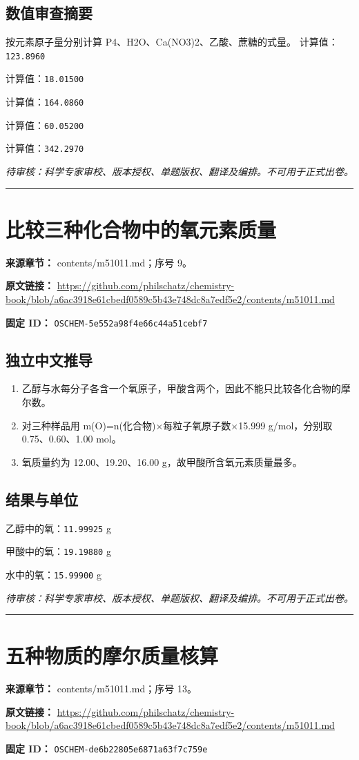 \documentclass[UTF8,11pt,oneside,openany,fontset=none]{ctexbook}
\begin{document}
\subsection*{数值审查摘要}
按元素原子量分别计算 P4、H2O、Ca(NO3)2、乙酸、蔗糖的式量。
\noindent 计算值：\texttt{123.8960}\par
\noindent 计算值：\texttt{18.01500}\par
\noindent 计算值：\texttt{164.0860}\par
\noindent 计算值：\texttt{60.05200}\par
\noindent 计算值：\texttt{342.2970}\par
\noindent\textit{待审核：科学专家审校、版本授权、单题版权、翻译及编排。不可用于正式出卷。}
\medskip\hrule\medskip
\section{比较三种化合物中的氧元素质量}
\noindent\textbf{来源章节：} contents/m51011.md；序号 9。\par
\noindent\textbf{原文链接：} \url{https://github.com/philschatz/chemistry-book/blob/a6ac3918e61cbedf0589c5b43e748dc8a7edf5e2/contents/m51011.md}\par
\noindent\textbf{固定 ID：} \texttt{OSCHEM-5e552a98f4e66c44a51cebf7}\par
\subsection*{独立中文推导}
\begin{enumerate}
\item 乙醇与水每分子各含一个氧原子，甲酸含两个，因此不能只比较各化合物的摩尔数。
\item 对三种样品用 m(O)=n(化合物)×每粒子氧原子数×15.999 g/mol，分别取 0.75、0.60、1.00 mol。
\item 氧质量约为 12.00、19.20、16.00 g，故甲酸所含氧元素质量最多。
\end{enumerate}
\subsection*{结果与单位}
\noindent 乙醇中的氧：\texttt{11.99925} g\par
\noindent 甲酸中的氧：\texttt{19.19880} g\par
\noindent 水中的氧：\texttt{15.99900} g\par
\noindent\textit{待审核：科学专家审校、版本授权、单题版权、翻译及编排。不可用于正式出卷。}
\medskip\hrule\medskip
\section{五种物质的摩尔质量核算}
\noindent\textbf{来源章节：} contents/m51011.md；序号 13。\par
\noindent\textbf{原文链接：} \url{https://github.com/philschatz/chemistry-book/blob/a6ac3918e61cbedf0589c5b43e748dc8a7edf5e2/contents/m51011.md}\par
\noindent\textbf{固定 ID：} \texttt{OSCHEM-de6b22805e6871a63f7c759e}\par
\end{document}
